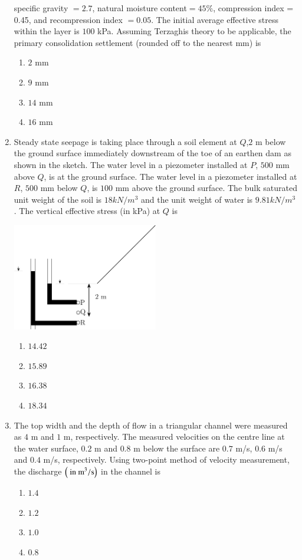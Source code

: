\documentclass[journal,12pt,onecolumn]{IEEEtran}
\theoremstyle{remark}
\begin{document}
\begin{enumerate}
specific gravity $= 2.7$, natural moisture content$ = 45\%$, compression index = 0.45, and
recompression index $= 0.05$. The initial average effective stress within the layer is $100$ kPa.
Assuming Terzaghis theory to be applicable, the primary consolidation settlement (rounded off to the nearest mm) is
\begin{enumerate}
    \item $2$ mm
    \item $9$ mm
    \item $14$ mm
    \item $16$ mm
\end{enumerate}
\item Steady state seepage is taking place through a soil element at $Q$,$2$ m below the ground surface immediately downstream of the
toe of an earthen dam as shown in the sketch. The water level in a piezometer installed at $P$, $500$ mm above $Q$, is at the ground surface. The water level in a piezometer installed at $R$, $500$ mm below $Q$, is $100$ mm above the ground surface. The bulk saturated unit weight of the soil is $18 kN/m^3$ and the unit weight of water is $9.81 kN/m^3$. The vertical effective stress (in kPa) at $Q$ is
\begin{center}

\includegraphics[width=0.5\textwidth]{figs/fig5/main} 
\end{center}
\begin{multicols}{4}
    \begin{enumerate}
        \item $14.42$
        \item $15.89$
        \item $16.38$
        \item $18.34$
    \end{enumerate}
\end{multicols}
\item The top width and the depth of flow in a triangular channel were measured as $4$ m and $1$ m, respectively. The measured velocities on the centre line at the water surface, $0.2$ m and $0.8$ m below the surface are $0.7$ m/s, $0.6$ m/s and $0.4$ m/s, respectively. Using two-point method of velocity measurement, the discharge $\left(\text{ in  m}^3/\text{s}\right)$ in the channel is
\begin{multicols}{4}
    \begin{enumerate}
        \item $1.4$
        \item $1.2$
        \item $1.0$
        \item $0.8$
    \end{enumerate}
\end{multicols}
\end{enumerate}
\end{document}
